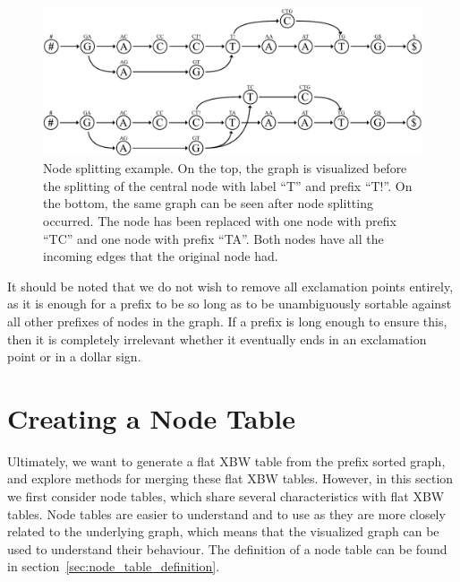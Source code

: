 \documentclass[a4paper,12pt,twoside,BCOR=10mm]{scrbook}
\begin{document}
\begin{figure}[!htb]
\centering
\includegraphics[width=\textwidth]{evo_fig_node_splitting.pdf}
\caption[Node splitting example]{Node splitting example. On the top, the graph is visualized before the splitting of the central node with label \textup{“T”} and prefix \textup{“T!”}. On the bottom, the same graph can be seen after node splitting occurred. The node has been replaced with one node with prefix \textup{“TC”} and one node with prefix \textup{“TA”}. Both nodes have all the incoming edges that the original node had.} \label{fig:evo_fig_node_splitting}
\end{figure}

It should be noted that we do not wish to remove all exclamation points entirely,
as it is enough for a prefix to be so long as to be unambiguously sortable against all
other prefixes of nodes in the graph. If a prefix is long enough to ensure this, then
it is completely irrelevant whether it eventually ends in an exclamation point or in a dollar sign.

\section{Creating a Node Table}
%

Ultimately, we want to generate a flat XBW table from the prefix sorted graph,
and explore methods for merging these flat XBW tables.
However, in this section we first consider node tables, which share several characteristics
with flat XBW tables.
Node tables are easier to understand and to use as they are more closely related to the
underlying graph, which means that the visualized graph can be used to understand their behaviour.
The definition of a node table can be found in section~\ref{sec:node_table_definition}.
\end{document}
